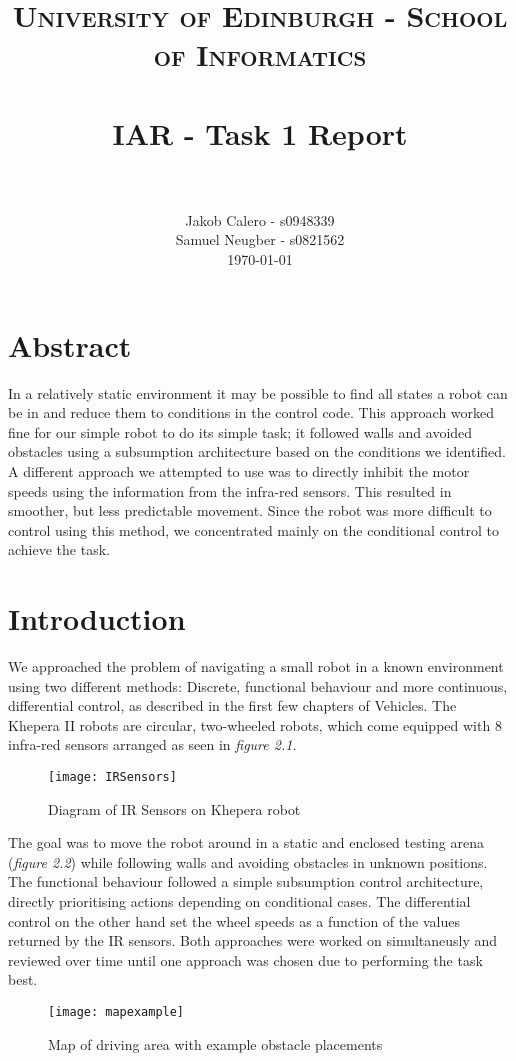 \documentclass[paper=a4, fontsize=12pt]{scrartcl}	%
\title{
\vspace{-1in} 	
\usefont{OT1}{bch}{b}{n}
\normalfont \normalsize \textsc{University of Edinburgh - School of Informatics} \\ [25pt]
\horrule{0.5pt} \\[0.4cm]
\large IAR - Task 1 Report \\
\horrule{1pt} \\[0.5cm]
}
\author{
  \normalfont \normalsize
  Jakob Calero - s0948339\\[-3pt]\normalsize
  Samuel Neugber - s0821562\\[-3pt]\normalsize
  \today
}
\date{}
\numberwithin{equation}{section}		%
\numberwithin{figure}{section}			%
\numberwithin{table}{section}				%
\begin{document}
\maketitle					%
\section{Abstract}
In a relatively static environment it may be possible to find all states a robot can be in and reduce them to conditions in the control code. This approach worked fine for our simple robot to do its simple task; it followed walls and avoided obstacles using a subsumption architecture based on the conditions we identified. A different approach we attempted to use was to directly inhibit the motor speeds using the information from the infra-red sensors. This resulted in smoother, but less predictable movement. Since the robot was more difficult to control using this method, we concentrated mainly on the conditional control to achieve the task.

\section{Introduction}
We approached the problem of navigating a small robot in a known environment using two different methods: Discrete, functional behaviour and more continuous, differential control, as described in the first few chapters of Vehicles\cite{vehicles}. The Khepera II robots are circular, two-wheeled robots, which come equipped with 8 infra-red sensors arranged as seen in \emph{figure 2.1}. 
\begin{figure}[!ht]
 \centering
  \texttt{[image: IRSensors]}
  \caption{Diagram of IR Sensors on Khepera robot}
\end{figure}

The goal was to move the robot around in a static and enclosed testing arena (\emph{figure 2.2}) while following walls and avoiding obstacles in unknown positions. The functional behaviour followed a simple subsumption control architecture, directly prioritising actions depending on conditional cases. The differential control on the other hand set the wheel speeds as a function of the values returned by the IR sensors. Both approaches were worked on simultaneusly and reviewed over time until one approach was chosen due to performing the task best.
\begin{figure}[!ht]
 \centering
  \texttt{[image: mapexample]}
  \caption{Map of driving area with example obstacle placements}
\end{figure}
\end{document}
